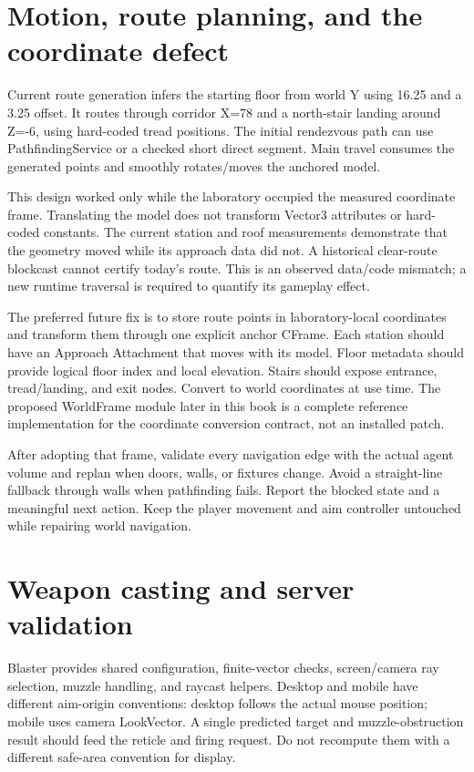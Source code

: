 \section{Motion, route planning, and the coordinate defect}
Current route generation infers the starting floor from world Y using 16.\allowbreak{}25 and a 3.\allowbreak{}25 offset.\allowbreak{} It routes through corridor X=78 and a north-stair landing around Z=-6, using hard-coded tread positions.\allowbreak{} The initial rendezvous path can use PathfindingService or a checked short direct segment.\allowbreak{} Main travel consumes the generated points and smoothly rotates/\allowbreak{}moves the anchored model.\allowbreak{}

This design worked only while the laboratory occupied the measured coordinate frame.\allowbreak{} Translating the model does not transform Vector3 attributes or hard-coded constants.\allowbreak{} The current station and roof measurements demonstrate that the geometry moved while its approach data did not.\allowbreak{} A historical clear-route blockcast cannot certify today's route.\allowbreak{} This is an observed data/\allowbreak{}code mismatch; a new runtime traversal is required to quantify its gameplay effect.\allowbreak{}

The preferred future fix is to store route points in laboratory-local coordinates and transform them through one explicit anchor CFrame.\allowbreak{} Each station should have an Approach Attachment that moves with its model.\allowbreak{} Floor metadata should provide logical floor index and local elevation.\allowbreak{} Stairs should expose entrance, tread/\allowbreak{}landing, and exit nodes.\allowbreak{} Convert to world coordinates at use time.\allowbreak{} The proposed WorldFrame module later in this book is a complete reference implementation for the coordinate conversion contract, not an installed patch.\allowbreak{}

After adopting that frame, validate every navigation edge with the actual agent volume and replan when doors, walls, or fixtures change.\allowbreak{} Avoid a straight-line fallback through walls when pathfinding fails.\allowbreak{} Report the blocked state and a meaningful next action.\allowbreak{} Keep the player movement and aim controller untouched while repairing world navigation.\allowbreak{}

\section{Weapon casting and server validation}
Blaster provides shared configuration, finite-vector checks, screen/\allowbreak{}camera ray selection, muzzle handling, and raycast helpers.\allowbreak{} Desktop and mobile have different aim-origin conventions: desktop follows the actual mouse position; mobile uses camera LookVector.\allowbreak{} A single predicted target and muzzle-obstruction result should feed the reticle and firing request.\allowbreak{} Do not recompute them with a different safe-area convention for display.\allowbreak{}

